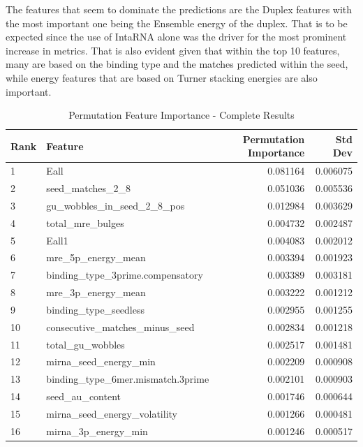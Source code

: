 \documentclass[en,ack]{dimscthesis}
\begin{document}
\par The features that seem to dominate the predictions are the Duplex features with the most important one being the Ensemble energy of the duplex. That is to be expected since the use of IntaRNA alone was the driver for the most prominent increase in metrics. That is also evident given that within the top 10 features, many are based on the binding type and the matches predicted within the seed, while energy features that are based on Turner stacking energies are also important.

\newpage
\begin{table}[H]
    \centering
    \caption{Permutation Feature Importance - Complete Results}
    \label{tbl:permutation_importance_complete}
    \footnotesize
    \begin{tabular}{llrr}
        \toprule
        \textbf{Rank} & \textbf{Feature} & \textbf{Permutation Importance} & \textbf{Std Dev} \\
        \midrule
        1 & Eall & 0.081164 & 0.006075 \\
        2 & seed\_matches\_2\_8 & 0.051036 & 0.005536 \\
        3 & gu\_wobbles\_in\_seed\_2\_8\_pos & 0.012984 & 0.003629 \\
        4 & total\_mre\_bulges & 0.004732 & 0.002487 \\
        5 & Eall1 & 0.004083 & 0.002012 \\
        6 & mre\_5p\_energy\_mean & 0.003394 & 0.001923 \\
        7 & binding\_type\_3prime.compensatory & 0.003389 & 0.003181 \\
        8 & mre\_3p\_energy\_mean & 0.003222 & 0.001212 \\
        9 & binding\_type\_seedless & 0.002955 & 0.001255 \\
        10 & consecutive\_matches\_minus\_seed & 0.002834 & 0.001218 \\
        11 & total\_gu\_wobbles & 0.002517 & 0.001481 \\
        12 & mirna\_seed\_energy\_min & 0.002209 & 0.000908 \\
        13 & binding\_type\_6mer.mismatch.3prime & 0.002101 & 0.000903 \\
        14 & seed\_au\_content & 0.001746 & 0.000644 \\
        15 & mirna\_seed\_energy\_volatility & 0.001266 & 0.000481 \\
        16 & mirna\_3p\_energy\_min & 0.001246 & 0.000517 \\

\end{tabular}
\end{table}
\end{document}
